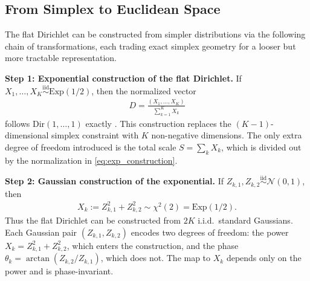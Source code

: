 \documentclass[11pt]{article}
\begin{document}
\subsection{From Simplex to Euclidean Space}
\label{sec:simplex_to_euclidean}

The flat Dirichlet can be constructed from simpler distributions via
the following chain of transformations, each trading exact simplex
geometry for a looser but more tractable representation.

\medskip
\noindent\textbf{Step 1: Exponential construction of the flat Dirichlet.}
If $X_1,\ldots,X_K\stackrel{\mathrm{iid}}{\sim}\mathrm{Exp}(1/2)$, then
the normalized vector
\begin{align}
    D = \frac{(X_1,\ldots,X_K)}{\sum_{k=1}^K X_k}
    \label{eq:exp_construction}
\end{align}
follows $\mathrm{Dir}(1,\ldots,1)$ exactly \cite{ferguson1973bayesian}.
This construction replaces the $(K-1)$-dimensional simplex constraint
with $K$ non-negative dimensions.
The only extra degree of freedom introduced is the total scale
$S=\sum_k X_k$, which is divided out by the normalization in
\eqref{eq:exp_construction}.

\medskip
\noindent\textbf{Step 2: Gaussian construction of the exponential.}
If $Z_{k,1}, Z_{k,2}\stackrel{\mathrm{iid}}{\sim}\mathcal{N}(0,1)$,
then
\begin{align}
    X_k := Z_{k,1}^2 + Z_{k,2}^2 \sim \chi^2(2) = \mathrm{Exp}(1/2).
    \label{eq:gaussian_exp}
\end{align}
Thus the flat Dirichlet can be constructed from $2K$ i.i.d.\ standard
Gaussians.
Each Gaussian pair $(Z_{k,1},Z_{k,2})$ encodes two degrees of freedom:
the power $X_k=Z_{k,1}^2+Z_{k,2}^2$, which enters the construction,
and the phase $\theta_k=\arctan(Z_{k,2}/Z_{k,1})$, which does not.
The map to $X_k$ depends only on the power and is phase-invariant.
\end{document}
